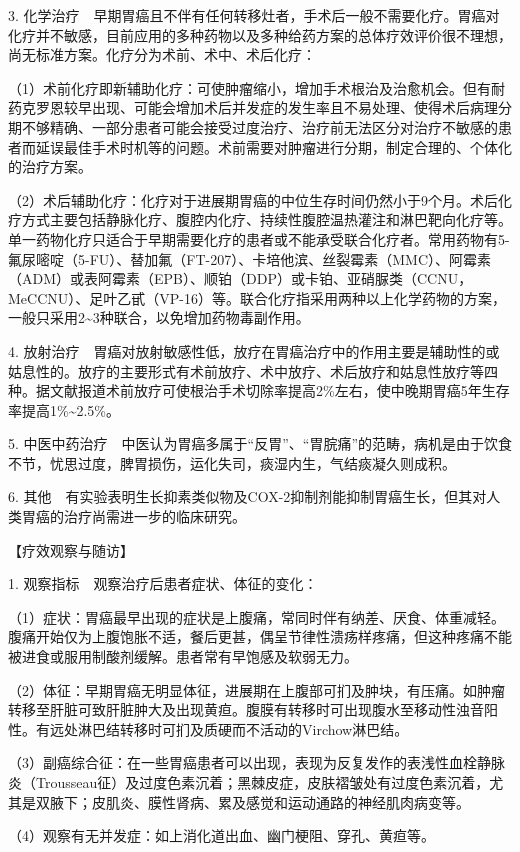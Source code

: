 3.
化学治疗　早期胃癌且不伴有任何转移灶者，手术后一般不需要化疗。胃癌对化疗并不敏感，目前应用的多种药物以及多种给药方案的总体疗效评价很不理想，尚无标准方案。化疗分为术前、术中、术后化疗：

（1）术前化疗即新辅助化疗：可使肿瘤缩小，增加手术根治及治愈机会。但有耐药克罗恩较早出现、可能会增加术后并发症的发生率且不易处理、使得术后病理分期不够精确、一部分患者可能会接受过度治疗、治疗前无法区分对治疗不敏感的患者而延误最佳手术时机等的问题。术前需要对肿瘤进行分期，制定合理的、个体化的治疗方案。

（2）术后辅助化疗：化疗对于进展期胃癌的中位生存时间仍然小于9个月。术后化疗方式主要包括静脉化疗、腹腔内化疗、持续性腹腔温热灌注和淋巴靶向化疗等。单一药物化疗只适合于早期需要化疗的患者或不能承受联合化疗者。常用药物有5-氟尿嘧啶（5-FU）、替加氟（FT-207）、卡培他滨、丝裂霉素（MMC）、阿霉素（ADM）或表阿霉素（EPB）、顺铂（DDP）或卡铂、亚硝脲类（CCNU，MeCCNU）、足叶乙甙（VP-16）等。联合化疗指采用两种以上化学药物的方案，一般只采用2\textasciitilde{}3种联合，以免增加药物毒副作用。

4.
放射治疗　胃癌对放射敏感性低，放疗在胃癌治疗中的作用主要是辅助性的或姑息性的。放疗的主要形式有术前放疗、术中放疗、术后放疗和姑息性放疗等四种。据文献报道术前放疗可使根治手术切除率提高2\%左右，使中晚期胃癌5年生存率提高1\%\textasciitilde{}2.5\%。

5.
中医中药治疗　中医认为胃癌多属于“反胃”、“胃脘痛”的范畴，病机是由于饮食不节，忧思过度，脾胃损伤，运化失司，痰湿内生，气结痰凝久则成积。

6.
其他　有实验表明生长抑素类似物及COX-2抑制剂能抑制胃癌生长，但其对人类胃癌的治疗尚需进一步的临床研究。

【疗效观察与随访】

1. 观察指标　观察治疗后患者症状、体征的变化：

（1）症状：胃癌最早出现的症状是上腹痛，常同时伴有纳差、厌食、体重减轻。腹痛开始仅为上腹饱胀不适，餐后更甚，偶呈节律性溃疡样疼痛，但这种疼痛不能被进食或服用制酸剂缓解。患者常有早饱感及软弱无力。

（2）体征：早期胃癌无明显体征，进展期在上腹部可扪及肿块，有压痛。如肿瘤转移至肝脏可致肝脏肿大及出现黄疸。腹膜有转移时可出现腹水至移动性浊音阳性。有远处淋巴结转移时可扪及质硬而不活动的Virchow淋巴结。

（3）副癌综合征：在一些胃癌患者可以出现，表现为反复发作的表浅性血栓静脉炎（Trousseau征）及过度色素沉着；黑棘皮症，皮肤褶皱处有过度色素沉着，尤其是双腋下；皮肌炎、膜性肾病、累及感觉和运动通路的神经肌肉病变等。

（4）观察有无并发症：如上消化道出血、幽门梗阻、穿孔、黄疸等。

